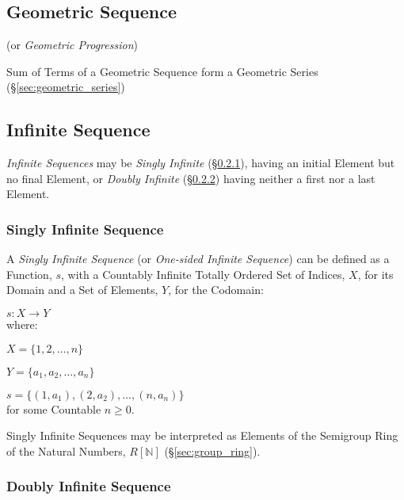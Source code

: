 \subsection{Geometric Sequence}\label{sec:geometric_sequence}

(or \emph{Geometric Progression})

Sum of Terms of a Geometric Sequence form a Geometric Series
(\S\ref{sec:geometric_series})



\subsection{Infinite Sequence}\label{sec:infinite_sequence}

\emph{Infinite Sequences} may be \emph{Singly Infinite}
(\S\ref{sec:singly_infinite}), having an initial Element but no final
Element, or \emph{Doubly Infinite} (\S\ref{sec:doubly_infinite})
having neither a first nor a last Element.



\subsubsection{Singly Infinite Sequence}\label{sec:singly_infinite}

A \emph{Singly Infinite Sequence} (or \emph{One-sided Infinite
  Sequence}) can be defined as a Function, $s$, with a Countably
Infinite Totally Ordered Set of Indices, $X$, for its Domain and a Set
of Elements, $Y$, for the Codomain:

  $s : X \rightarrow Y$ \\
where:

  $X = \{1,2,\ldots,n\}$

  $Y = \{a_1, a_2,\ldots,a_n\}$

  $s = \{(1,a_1), (2,a_2),\ldots, (n,a_n)\}$ \\
for some Countable $n \geq 0$.

Singly Infinite Sequences may be interpreted as Elements of the
Semigroup Ring of the Natural Numbers, $R[\mathbb{N}]$
(\S\ref{sec:group_ring}).



\subsubsection{Doubly Infinite Sequence}\label{sec:doubly_infinite}

